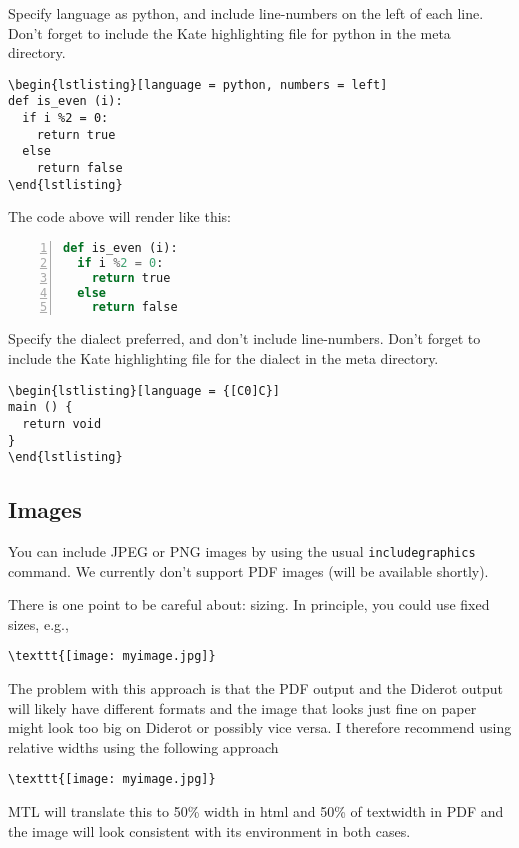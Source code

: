 \begin{flex}
\begin{example}
Specify language as python, and include  line-numbers on the left of each line.
Don't forget to include the Kate highlighting file for python in the meta directory.

\begin{verbatim}
\begin{lstlisting}[language = python, numbers = left]
def is_even (i):
  if i %2 = 0:
    return true
  else 
    return false
\end{lstlisting}
\end{verbatim}
\end{example}

The code above will render like this:
%
\begin{lstlisting}[language = python, numbers = left]
def is_even (i):
  if i %2 = 0:
    return true
  else 
    return false
\end{lstlisting}
\end{flex}


\begin{example}
Specify the dialect preferred, and don't include line-numbers.
%
Don't forget to include the Kate highlighting file for the dialect in the meta directory.

\begin{verbatim}
\begin{lstlisting}[language = {[C0]C}]
main () {
  return void
}
\end{lstlisting}
\end{verbatim}
\end{example}
\subsection{Images}

You can include JPEG or PNG images by using the usual \lstinline`includegraphics` command.  
%
We currently don't support PDF images (will be available shortly).

There is one point to be careful about: sizing.  
%
In principle, you could use fixed sizes, e.g.,
\begin{lstlisting}
\texttt{[image: myimage.jpg]}
\end{lstlisting}
%
The problem with this approach is that the PDF output and the Diderot output will likely have different formats and the image that looks just fine on paper might look too big on Diderot or possibly vice versa.
%
I therefore recommend using relative widths using the following approach
\begin{lstlisting}
\texttt{[image: myimage.jpg]}
\end{lstlisting}
MTL will translate this to 50\% width in html and 50\% of textwidth in PDF and the image will look consistent with its environment in both cases.  

